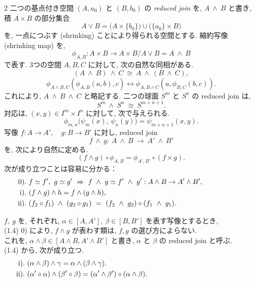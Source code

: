 \documentclass[10pt, leqno]{ltjsarticle}
\newcommand{\shrink}{\phi}
\numberwithin{equation}{section}
\theoremstyle{plain}
\theoremstyle{definition}
\theoremstyle{remark}
\begin{document}
\begin{paracol}{2}
二つの基点付き空間 $(A,a_0)$ と $(B,b_0)$ の \emph{reduced join} を, 
$A\ \wedge\ B$ と書き, \\
積 $A\times B$ の部分集合
\[
A\vee B=\bigl(A\times\{b_0\}\bigr)\cup\bigl(\{a_0\}\times B\bigr)
\]
を, 一点につぶす (shrinking) ことにより得られる空間とする. 
縮約写像 (shrinking map) を,
\[
\shrink_{A,B}:A\times B\longrightarrow
A\times B/A\vee B = A\ \wedge\ B
\]
で表す. 3つの空間 $A,B,C$ に対して, 次の自然な同相がある.
\[
(A\ \wedge\ B)\ \wedge\ C\ \cong\ A\ \wedge\ (B\ \wedge\ C),
\]
\[
\phi_{A\wedge B, C}(\phi_{A,B}(a,b),c)\longleftrightarrow
\phi_{A,B\wedge C}(a, \phi_{B,C}(b,c)).
\]
これにより, $A\ \wedge\ B\ \wedge\ C$ と略記する. 
二つの球面 $S^m$ と $S^n$ の reduced join は,
\begin{equation}
S^m\ \wedge\ S^n\ \cong\ S^{m+n+1}.
\end{equation}
対応は, 
$(x,y)\in I^m\times I^n$ に対して,
次で与えられる.
\[
\shrink_{m,n}\bigl(\psi_m(x),\,\psi_n(y)\bigr)=\psi_{m+n+1}(x,y).
\]
写像
\(
f:A\to A',\quad g:B\to B'
\)
に対し, reduced join
\[
f\ \wedge \ g:\ A\ \wedge\ B\ \longrightarrow\ A'\ \wedge\ B'
\]
を, 次により自然に定める.
\[
(f\wedge g)\circ \phi_{A,B} = \phi_{A',B'}\circ (f\times g).
\]
次が成り立つことは容易に分かる：
\begin{equation}
\raisetag{3ex}
\begin{aligned}[t]
\text{0).}\ & f\simeq f',\ g\simeq g' \ \Rightarrow\ 
f\ \wedge\ g\simeq f'\ \wedge\ g': A\wedge B\to A'\wedge B',
\qquad\qquad\qquad\\
\text{i).}\ & (f\wedge g)\wedge h = f\wedge (g\wedge h),\\
\text{ii).}\ & (f_2\circ f_1)\ \wedge\ (g_2\circ g_1)\ 
= \ (f_2\ \wedge\ g_2)\circ(f_1\ \wedge\ g_1).
\end{aligned}
\end{equation}

\(f,\ g\) 
を, それぞれ,
\(\alpha\in[A,A'],\ \beta\in[B,B']\)
を表す写像とするとき,\\
(1.4) 0) により,
\(f\wedge g\) 
が表わす類は, 
\(f,g\) の選び方によらない.\\
これを,
\(\alpha\wedge \beta\in[A\wedge B, A'\wedge B']\)
と書き, \(\alpha\) と \(\beta\) の
reduced join と呼ぶ.\\
(1.4) から, 次が成り立つ.
\begin{equation}
\raisetag{3ex}
\begin{aligned}[t]
  \text{i).}\ & (\alpha\wedge\beta)\wedge\gamma 
  = \alpha\wedge(\beta\wedge\gamma).\\
  \text{ii).}\ & (\alpha'\circ\alpha)\wedge(\beta'\circ\beta)
  = (\alpha'\wedge\beta')\circ(\alpha\wedge\beta).
  \qquad\qquad\qquad\qquad\qquad\qquad\qquad
\end{aligned}
\end{equation}


\end{paracol}
\end{document}
